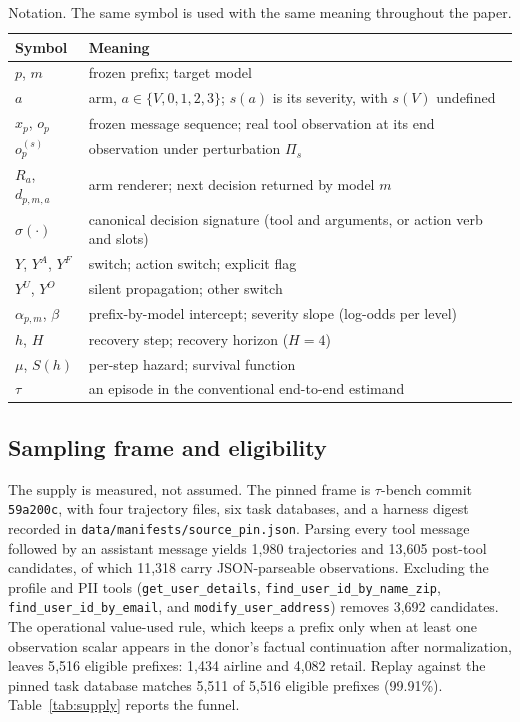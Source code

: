 \documentclass[a4paper,fleqn]{cas-sc}
\begin{document}
\begin{table}[pos=htbp]
  \centering
  \caption{Notation. The same symbol is used with the same meaning throughout the paper.}
  \label{tab:notation}
  \small
  \begin{tabular}{>{\raggedright\arraybackslash}p{2.1cm}>{\raggedright\arraybackslash}p{11.6cm}}
    \toprule
    \textbf{Symbol} & \textbf{Meaning} \\
    \midrule
    $p$, $m$ & frozen prefix; target model \\
    $a$ & arm, $a\in\{V,0,1,2,3\}$; $s(a)$ is its severity, with $s(V)$ undefined \\
    $x_p$, $o_p$ & frozen message sequence; real tool observation at its end \\
    $o_p^{(s)}$ & observation under perturbation $\Pi_s$ \\
    $R_a$, $d_{p,m,a}$ & arm renderer; next decision returned by model $m$ \\
    $\sigma(\cdot)$ & canonical decision signature (tool and arguments, or action verb and slots) \\
    $Y$, $Y^{A}$, $Y^{F}$ & switch; action switch; explicit flag \\
    $Y^{U}$, $Y^{O}$ & silent propagation; other switch \\
    $\alpha_{p,m}$, $\beta$ & prefix-by-model intercept; severity slope (log-odds per level) \\
    $h$, $H$ & recovery step; recovery horizon ($H=4$) \\
    $\mu$, $S(h)$ & per-step hazard; survival function \\
    $\tau$ & an episode in the conventional end-to-end estimand \\
    \bottomrule
  \end{tabular}
\end{table}

\subsection{Sampling frame and eligibility}

\label{sec:supply}

The supply is measured, not assumed. The pinned frame is $\tau$-bench commit \texttt{59a200c},
with four trajectory files, six task databases, and a harness digest recorded in
\texttt{data/manifests/source\_pin.json}. Parsing every tool message followed by an assistant
message yields 1{,}980 trajectories and 13{,}605 post-tool candidates, of which 11{,}318 carry
JSON-parseable observations. Excluding the profile and PII tools
(\texttt{get\_user\_details}, \texttt{find\_user\_id\_by\_name\_zip},
\texttt{find\_user\_id\_by\_email}, and \texttt{modify\_user\_address}) removes 3{,}692
candidates. The operational value-used rule, which keeps a prefix only when at least one
observation scalar appears in the donor's factual continuation after normalization, leaves
5{,}516 eligible prefixes: 1{,}434 airline and 4{,}082 retail. Replay against the pinned task
database matches 5{,}511 of 5{,}516 eligible prefixes (99.91\%). Table~\ref{tab:supply} reports
the funnel.
\end{document}
